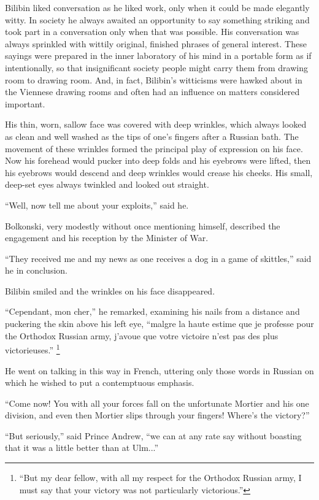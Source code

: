 Bilibin liked conversation as he liked work, only when it could
be made elegantly witty. In society he always awaited an
opportunity to say something striking and took part in a
conversation only when that was possible. His conversation was
always sprinkled with wittily original, finished phrases of
general interest. These sayings were prepared in the inner
laboratory of his mind in a portable form as if intentionally, so
that insignificant society people might carry them from drawing
room to drawing room. And, in fact, Bilibin's witticisms were
hawked about in the Viennese drawing rooms and often had an
influence on matters considered important.

His thin, worn, sallow face was covered with deep wrinkles, which
always looked as clean and well washed as the tips of one's
fingers after a Russian bath. The movement of these wrinkles
formed the principal play of expression on his face. Now his
forehead would pucker into deep folds and his eyebrows were
lifted, then his eyebrows would descend and deep wrinkles would
crease his cheeks. His small, deep-set eyes always twinkled and
looked out straight.

``Well, now tell me about your exploits,'' said he.

Bolkonski, very modestly without once mentioning himself,
described the engagement and his reception by the Minister of
War.

``They received me and my news as one receives a dog in a game of
skittles,'' said he in conclusion.

Bilibin smiled and the wrinkles on his face disappeared.

``Cependant, mon cher,'' he remarked, examining his nails from a
distance and puckering the skin above his left eye, ``malgre la
haute estime que je professe pour the Orthodox Russian army,
j'avoue que votre victoire n'est pas des plus victorieuses.''
\footnote{``But my dear fellow, with all my respect for the
Orthodox Russian army, I must say that your victory was not
particularly victorious.''}

He went on talking in this way in French, uttering only those
words in Russian on which he wished to put a contemptuous
emphasis.

``Come now! You with all your forces fall on the unfortunate
Mortier and his one division, and even then Mortier slips through
your fingers!  Where's the victory?''

``But seriously,'' said Prince Andrew, ``we can at any rate say
without boasting that it was a little better than at Ulm...''

